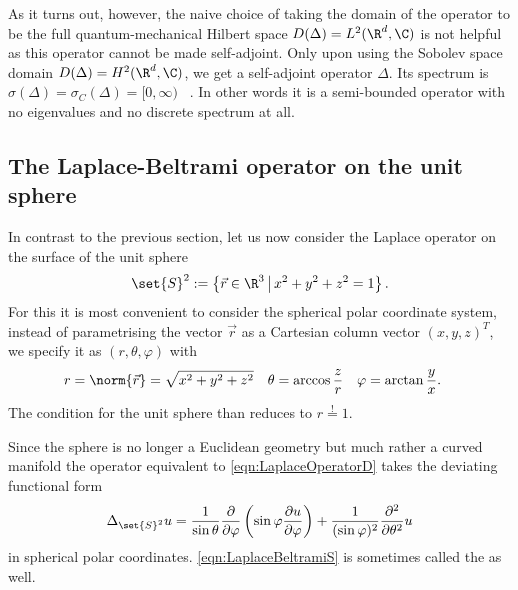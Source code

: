 As it turns out, however,
the naive choice of taking the domain of the operator to be the full
quantum-mechanical Hilbert space $D(\Delta) = L^2(\R^d, \C)$
is not helpful as this operator cannot be made self-adjoint.
Only upon using the Sobolev space domain $D(\Delta) = H^2(\R^d, \C)$,
we get a self-adjoint operator $\Delta$.
Its spectrum is $\sigma(\Delta) = \sigma_C(\Delta) = [0, \infty)$%
~\cite[example 3.2.2]{Davies2007}.
In other words it is a semi-bounded operator with no eigenvalues and no
discrete spectrum at all.

\subsection{The Laplace-Beltrami operator on the unit sphere}
\label{sec:SpectrumLaplaceBeltrami}

In contrast to the previous section,
let us now consider the Laplace operator on the surface of the unit sphere
\[
	\set{S}^2 := \left\{ \vec{r} \in \R^3 \, \middle| \, x^2 + y^2 + z^2 = 1 \right\}.
\]
For this it is most convenient to consider
the spherical polar coordinate system,
\ie instead of parametrising the vector $\vec{r}$ as a
Cartesian column vector $(x, y, z)^T$,
we specify it as $(r, \theta, \varphi)$ with
\begin{align*}
	r &= \norm{\vec{r}} = \sqrt{x^2+y^2+z^2} & \theta &= \arccos\frac{z}{r} & \varphi &= \arctan\frac{y}{x}.
\end{align*}
The condition for the unit sphere than reduces to $r\stackrel{!}{=}1$.

Since the sphere is no longer a Euclidean geometry
but much rather a curved manifold
the operator equivalent to \eqref{eqn:LaplaceOperatorD} takes
the deviating functional form
\newcommand{\laplaceSphere}{\Delta_{\set{S}^2}}
\begin{equation}
	\laplaceSphere  u = \frac{1}{\sin \theta} \frac{\partial}{\partial \varphi}
\left( \sin \varphi \frac{\partial u}{\partial \varphi}  \right)
+ \frac{1}{(\sin \varphi)^2} \frac{\partial^2}{\partial \theta^2} u
	\label{eqn:LaplaceBeltramiS}
\end{equation}
in spherical polar coordinates.
\eqref{eqn:LaplaceBeltramiS} is sometimes called the
 as well.

